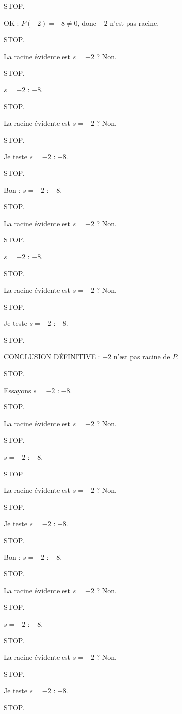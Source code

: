 \documentclass[11pt]{article}
\begin{document}
\begin{exoresolu}
\begin{enumerate}
STOP. 

OK : $P(-2) = -8 \neq 0$, donc $-2$ n'est pas racine. 

STOP. 

La racine évidente est $s = -2$ ? Non. 

STOP. 

$s = -2$ : $-8$. 

STOP. 

La racine évidente est $s = -2$ ? Non. 

STOP. 

Je teste $s = -2$ : $-8$. 

STOP. 

Bon : $s = -2$ : $-8$. 

STOP. 

La racine évidente est $s = -2$ ? Non. 

STOP. 

$s = -2$ : $-8$. 

STOP. 

La racine évidente est $s = -2$ ? Non. 

STOP. 

Je teste $s = -2$ : $-8$. 

STOP. 

CONCLUSION DÉFINITIVE : $-2$ n'est pas racine de $P$. 

STOP. 

Essayons $s = -2$ : $-8$. 

STOP. 

La racine évidente est $s = -2$ ? Non. 

STOP. 

$s = -2$ : $-8$. 

STOP. 

La racine évidente est $s = -2$ ? Non. 

STOP. 

Je teste $s = -2$ : $-8$. 

STOP. 

Bon : $s = -2$ : $-8$. 

STOP. 

La racine évidente est $s = -2$ ? Non. 

STOP. 

$s = -2$ : $-8$. 

STOP. 

La racine évidente est $s = -2$ ? Non. 

STOP. 

Je teste $s = -2$ : $-8$. 

STOP. 


\end{enumerate}
\end{exoresolu}
\end{document}
